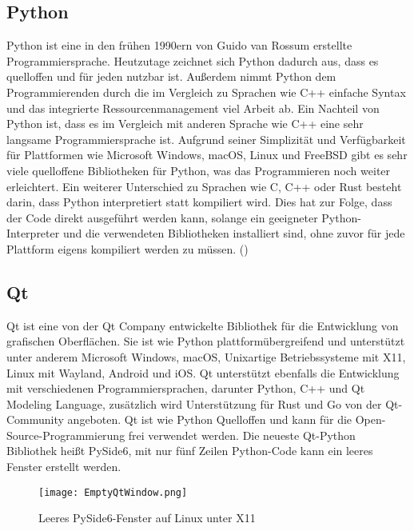 \subsection{Python}
\label{subsec:tPython}
Python ist eine in den frühen 1990ern von Guido van Rossum erstellte Programmiersprache. Heutzutage zeichnet sich Python dadurch aus, dass es quelloffen und für jeden nutzbar ist. Außerdem nimmt Python dem Programmierenden durch die im Vergleich zu Sprachen wie C++ einfache Syntax und das integrierte Ressourcenmanagement viel Arbeit ab. Ein Nachteil von Python ist, dass es im Vergleich mit anderen Sprache wie C++ eine sehr langsame Programmiersprache ist. Aufgrund seiner Simplizität und Verfügbarkeit für Plattformen wie Microsoft Windows, macOS, Linux und FreeBSD gibt es sehr viele quelloffene Bibliotheken für Python, was das Programmieren noch weiter erleichtert. Ein weiterer Unterschied zu Sprachen wie C, C++ oder Rust besteht darin, dass Python interpretiert statt kompiliert wird. Dies hat zur Folge, dass der Code direkt ausgeführt werden kann, solange ein geeigneter Python-Interpreter und die verwendeten Bibliotheken installiert sind, ohne zuvor für jede Plattform eigens kompiliert werden zu müssen.
(\cite{matthes-2019})

\subsection{Qt}
\label{subsec:tQt}
Qt ist eine von der Qt Company entwickelte Bibliothek für die Entwicklung von grafischen Oberflächen. Sie ist wie Python plattformübergreifend und unterstützt unter anderem Microsoft Windows, macOS, Unixartige Betriebssysteme mit X11, Linux mit Wayland, Android und iOS. Qt unterstützt ebenfalls die Entwicklung mit verschiedenen Programmiersprachen, darunter Python, C++ und Qt Modeling Language, zusätzlich wird Unterstützung für Rust und Go von der Qt-Community angeboten. Qt ist wie Python Quelloffen und kann für die Open-Source-Programmierung frei verwendet werden. Die neueste Qt-Python Bibliothek heißt PySide6, mit nur fünf Zeilen Python-Code kann ein leeres Fenster erstellt werden.
\begin{figure}[h]
\centering
\texttt{[image: EmptyQtWindow.png]}
\caption{Leeres PySide6-Fenster auf Linux unter X11}
\label{fig:EmptyQtWindow}
\end{figure}

